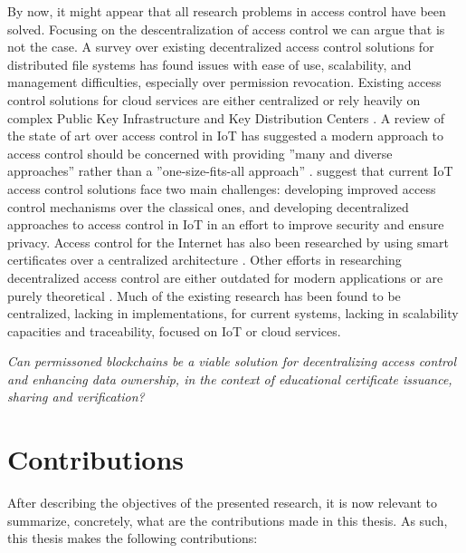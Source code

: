 By now, it might appear that all research problems in access control have been solved. Focusing on the descentralization of access control we can argue that is not the case. A survey over existing decentralized access control solutions \cite{miltchev_decentralized_2008} for distributed file systems has found issues with ease of use, scalability, and management difficulties, especially over permission revocation. Existing access control solutions for cloud services are either centralized \cite{calero_toward_2010, ruj_dacc:_2011, yu_achieving_2010} or rely heavily on complex Public Key Infrastructure and Key Distribution Centers \cite{ruj_privacy_2012, ruj_decentralized_2014,bauer_distributed_2005}. A review of the state of art over access control in IoT \cite{ouaddah_access_2017} has suggested a modern approach to access control should be concerned with providing ”many and diverse approaches” \cite[242]{ouaddah_access_2017} rather than a ”one-size-fits-all approach” \cite[242]{ouaddah_access_2017}. \citeauthor{ouaddah_access_2017} suggest that current IoT access control solutions face two main challenges: developing improved access control mechanisms over the classical ones, and developing decentralized approaches to access control in IoT in an effort to improve security and ensure privacy. Access control for the Internet has also been researched by using smart certificates over a centralized architecture \cite{park_smart_1999}. Other efforts in researching decentralized access control are either outdated for modern applications \cite{satyanarayanan_integrating_1989, karger_non-discretionary_1977} or are purely theoretical \cite{thomas_towards_1993}. Much of the existing research has been found to be centralized, lacking in implementations, for current systems, lacking in scalability capacities and traceability, focused on IoT or cloud services.

\begin{displayquote}
	\textit{Can permissoned blockchains be a viable solution for decentralizing access control and enhancing data ownership, in the context of educational certificate issuance, sharing and verification?}
\end{displayquote}

\section{Contributions}
\label{sec:contributions}

After describing the objectives of the presented research, it is now relevant to summarize, concretely, what are the contributions made in this thesis. As such, this thesis makes the following contributions:


